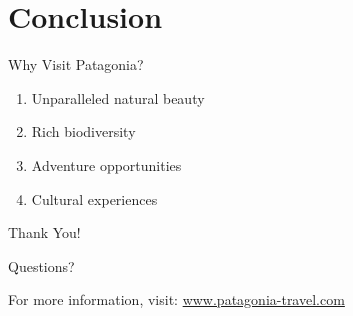 \documentclass[t, aspectratio=169]{beamer}
\begin{document}
\section{Conclusion}

\begin{frame}{Why Visit Patagonia?}
  \begin{enumerate}
    \item Unparalleled natural beauty
    \item Rich biodiversity
    \item Adventure opportunities
    \item Cultural experiences
  \end{enumerate}
\end{frame}

\begin{frame}{Thank You!}
  \begin{center}
    \Huge{Questions?}
    
    \vspace{1cm}
    
    \normalsize{For more information, visit:}
    \url{www.patagonia-travel.com}
  \end{center}
\end{frame}
\end{document}
